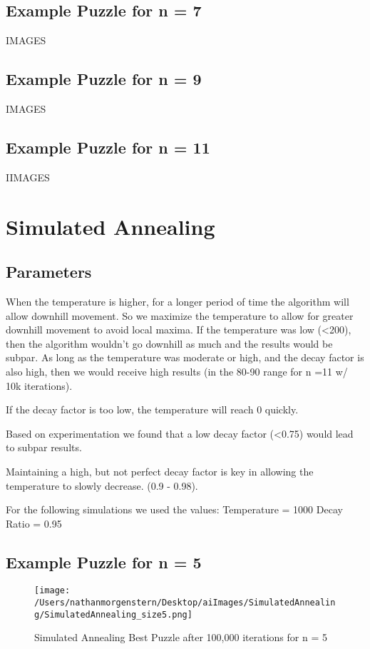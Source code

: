 \documentclass{report}
\begin{document}
\subsection{Example Puzzle for n = 7}
IMAGES
\subsection{Example Puzzle for n = 9}
IMAGES
\subsection{Example Puzzle for n = 11}
IIMAGES

\newpage
\section{Simulated Annealing}
\subsection{Parameters}
When the temperature is higher, for a longer period of time the algorithm will allow downhill movement. So we maximize the temperature to allow for greater downhill movement to avoid local maxima.
If the temperature was low (<200), then the algorithm wouldn't go downhill as much and the results would be subpar. As long as the temperature was moderate or high, and the decay factor is also high, then we would receive high results (in the 80-90 range for n =11 w/ 10k iterations).

If the decay factor is too low, the temperature will reach 0 quickly.

Based on experimentation we found that a low decay factor (<0.75) would lead to subpar results. 

Maintaining a high, but not perfect decay factor is key in allowing the temperature to slowly decrease. (0.9 - 0.98).

For the following simulations we used the values:
Temperature = 1000
Decay Ratio = 0.95

\subsection{Example Puzzle for n = 5}

	\begin{figure}[H]
	\centering
	\texttt{[image: /Users/nathanmorgenstern/Desktop/aiImages/SimulatedAnnealing/SimulatedAnnealing\_size5.png]}
	\caption{Simulated Annealing Best Puzzle after 100,000 iterations for n = 5} 
	\label{fig: Simulated Annealing Best Puzzle after 100,000 iterations for n = 5}
	\end{figure}
	
\end{document}
